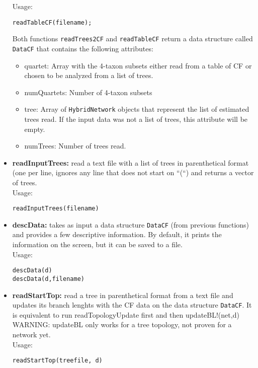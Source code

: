 \documentclass[12pt]{article}
\begin{document}
\begin{itemize}
Usage:
\begin{lstlisting}
readTableCF(filename);
\end{lstlisting}

Both functions \texttt{readTrees2CF} and \texttt{readTableCF} return a
data structure called \texttt{DataCF} that contains the following
attributes:
\begin{itemize}
\item{quartet: Array with the 4-taxon subsets either read from a table of CF
    or chosen to be analyzed from a list of trees.}
\item{numQuartets: Number of 4-taxon subsets}
\item{tree: Array of \texttt{HybridNetwork} objects that represent the
  list of estimated trees read. If the input data was not a list of
  trees, this attribute will be empty.}
\item{numTrees: Number of trees read.}
\end{itemize}


\item \textbf{readInputTrees:} read a text file with a list of trees
  in parenthetical format (one per line, ignores any line that does
  not start on ``(``) and
  returns a vector of trees.\\
  Usage:
\begin{lstlisting}
readInputTrees(filename)
\end{lstlisting}

\item \textbf{descData:} takes as input a data structure \texttt{DataCF} (from
  previous functions) and provides a few descriptive information. By
  default, it prints the information on the screen, but it can be
  saved to a file.\\
Usage:
\begin{lstlisting}
descData(d)
descData(d,filename)
\end{lstlisting}

\item \textbf{readStartTop:} read a tree in parenthetical format from
  a text file and updates its branch lenghts with the CF data on
  the data structure \texttt{DataCF}. It is equivalent to run
  readTopologyUpdate first and then updateBL!(net,d)\\
  WARNING: updateBL only works for a tree topology, not proven for a
  network yet.\\  Usage:
\begin{lstlisting}
readStartTop(treefile, d)
\end{lstlisting}

\end{itemize}
\end{document}
